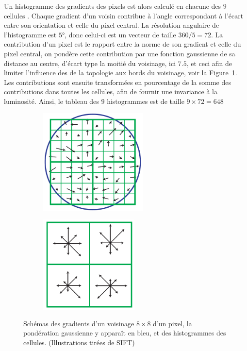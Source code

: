 \documentclass[
	a4paper, %
	10pt, %
	unnumberedsections, %
	twoside, %
]{LTJournalArticle}
\begin{document}
Un histogramme des gradients des pixels est alors calculé en chacune des $9$ cellules .
Chaque gradient d'un voisin contribue à
l'angle correspondant à l'écart entre son orientation et celle du pixel central.
La résolution angulaire de l'histogramme est $5$°, donc celui-ci est un vecteur de taille
$360 / 5 = 72$.
La contribution d'un pixel
est le rapport entre la norme de son gradient et celle du pixel central,
on pondère cette contribution par une fonction gaussienne de sa distance au centre,
d'écart type la moitié du voisinage, ici $7.5$, et ceci afin de limiter l'influence des
de la topologie aux bords du voisinage, voir la Figure~\ref{figure:lowe_desc_constr}.
Les contributions sont ensuite transformées en pourcentage
de la somme des contributions dans toutes les cellules, afin de fournir une invariance
à la luminosité. Ainsi, le tableau des $9$ histogrammes est de taille $9 \times 72 = 648$

\begin{figure}[H]
	\centering
	\begin{subfigure}[H]{\columnwidth}
		\centering
		\includegraphics[width=0.6\textwidth]{images/lowe_grads.png}
	\end{subfigure}
	\begin{subfigure}[H]{\columnwidth}
		\centering
		\includegraphics[width=0.55\textwidth]{images/lowe_desc.png}
	\end{subfigure}
	\caption{Schémas des gradients d'un voisinage $8 \times 8$ d'un pixel, la pondération
		gaussienne y apparaît en bleu, et des histogrammes des cellules. (Illustrations tirées
		de SIFT) }
	\label{figure:lowe_desc_constr}
\end{figure}
\end{document}
